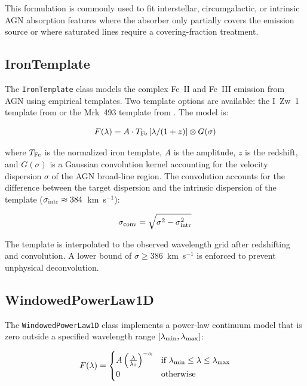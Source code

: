 \documentclass[11pt]{article}
\begin{document}
This formulation is commonly used to fit interstellar, circumgalactic, or intrinsic AGN absorption features where the absorber only partially covers the emission source or where saturated lines require a covering-fraction treatment.

\subsection{IronTemplate}

The \texttt{IronTemplate} class models the complex Fe~II and Fe~III emission from AGN using empirical templates. Two template options are available: the I~Zw~1 template from \citet{Boroson1992} or the Mrk~493 template from \citet{Park2022}. The model is:

\begin{equation}
F(\lambda) = A \cdot T_{\rm Fe}\left[\lambda/(1+z)\right] \otimes G(\sigma)
\end{equation}

where $T_{\rm Fe}$ is the normalized iron template, $A$ is the amplitude, $z$ is the redshift, and $G(\sigma)$ is a Gaussian convolution kernel accounting for the velocity dispersion $\sigma$ of the AGN broad-line region. The convolution accounts for the difference between the target dispersion and the intrinsic dispersion of the template ($\sigma_{\rm intr} \approx 384$~km~s$^{-1}$):

\begin{equation}
\sigma_{\rm conv} = \sqrt{\sigma^2 - \sigma_{\rm intr}^2}
\end{equation}

The template is interpolated to the observed wavelength grid after redshifting and convolution. A lower bound of $\sigma \geq 386$~km~s$^{-1}$ is enforced to prevent unphysical deconvolution.

\subsection{WindowedPowerLaw1D}

The \texttt{WindowedPowerLaw1D} class implements a power-law continuum model that is zero outside a specified wavelength range $[\lambda_{\rm min}, \lambda_{\rm max}]$:

\begin{equation}
F(\lambda) = \begin{cases}
A \left(\frac{\lambda}{\lambda_0}\right)^{-\alpha} & \text{if } \lambda_{\rm min} \leq \lambda \leq \lambda_{\rm max} \\
0 & \text{otherwise}
\end{cases}
\end{equation}
\end{document}
